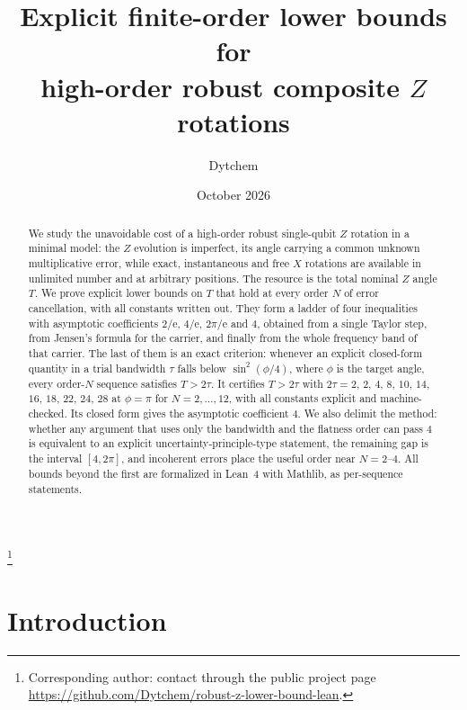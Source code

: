 \documentclass[%
  aps,
  pra,
  preprint,
  superscriptaddress,
  amsmath,amssymb,
  nofootinbib,
  floatfix,
]{revtex4-2}
\theoremstyle{definition}
\theoremstyle{remark}
\newcommand{\e}{\mathrm e}
\begin{document}
\title{Explicit finite-order lower bounds for\\
high-order robust composite $Z$ rotations}

\author{Dytchem}
\thanks{Corresponding author: contact through the public project page
\url{https://github.com/Dytchem/robust-z-lower-bound-lean}.}
\date{October 2026}

\begin{abstract}
We study the unavoidable cost of a high-order robust single-qubit $Z$ rotation in a minimal
model: the $Z$ evolution is imperfect, its angle carrying a common unknown multiplicative
error, while exact, instantaneous and free $X$ rotations are available in unlimited number and
at arbitrary positions. The resource is the total nominal $Z$ angle $T$. We prove explicit
lower bounds on $T$ that hold at every order $N$ of error cancellation, with all constants
written out. They form a ladder of four inequalities with asymptotic coefficients $2/\e$,
$4/\e$, $2\pi/\e$ and $4$, obtained from a single Taylor step, from Jensen's formula for the
carrier, and finally from the whole frequency band of that carrier. The last of them is an
exact criterion: whenever an explicit closed-form quantity in a trial bandwidth $\tau$ falls
below $\sin^2(\phi/4)$, where $\phi$ is the target angle, every order-$N$ sequence satisfies
$T>2\tau$. It certifies $T>2\tau$ with $2\tau=2$, $2$, $4$, $8$, $10$, $14$, $16$, $18$, $22$,
$24$, $28$ at $\phi=\pi$ for $N=2,\dots,12$, with all constants explicit and machine-checked.
Its closed form gives the asymptotic coefficient $4$. We also delimit the method: whether any
argument that uses only the bandwidth and the flatness order can pass $4$ is equivalent to an
explicit uncertainty-principle-type statement, the remaining gap is the interval $[4,2\pi]$,
and incoherent errors place the useful order near $N=2$--$4$. All bounds beyond the first are
formalized in Lean~4 with Mathlib, as per-sequence statements.
\end{abstract}


\maketitle

\section{Introduction}
\label{sec:intro}
\end{document}
